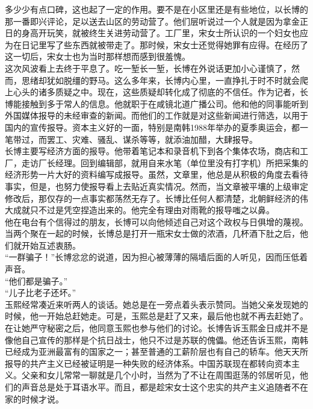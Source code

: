 多少少有点口碑，这也起了一定的作用。要不是在小区里还是有些地位，以长博的那一番即兴评论，足以送去山区的劳动营了。他们层听说过一个人就是因为拿金正日的身高开玩笑，就被终生关进劳动营了。工厂里，宋女士所认识的一个妇女也应为在日记里写了些东西就被带走了。那时候，宋女士还觉得她罪有应得。在经历了这一切后，宋女士也为当时那样想而感到很羞愧。\\

这次风波看上去终于平息了。吃一堑长一堑，长博在外说话更加小心谨慎了，然而，思绪却犹如脱缰的野马。这么多年来，长博内心里，一直挣扎于时不时就会爬上心头的诸多质疑之中。现在，这些质疑却转化成了彻底的不信任。作为记者，长博能接触到多于常人的信息。他就职于在咸镜北道广播公司。他和他的同事能听到外国媒体报导的未经审查的新闻。而他们的工作就是对这些新闻进行筛选，以用于国内的宣传报导。资本主义好的一面，特别是南韩1988年举办的夏季奥运会，都一笔带过，而罢工、灾难、骚乱、谋杀等等，就添油加醋，大肆报导。\\

长博主要写经济方面的报导。他带着笔记本和录音机下到各个集体农场，商店和工厂，走访厂长经理。回到编辑部，就用自来水笔（单位里没有打字机）所把采集的经济形势一片大好的资料编写成报导。虽然，文章里，他总是从积极的角度去看待事实，但是，也努力使报导看上去贴近真实情况。然而，当文章被平壤的上级审定修改后，那仅存的一点事实都荡然无存了。长博比任何人都清楚，北朝鲜经济的伟大成就只不过是凭空捏造出来的。他完全有理由对雨靴的报导嗤之以鼻。\\

他在电台有个信得过的朋友，长博可以向他倾述自己对这个政权与日俱增的蔑视。当两个聚在一起的时候，长博总是打开一瓶宋女士做的浓酒，几杯酒下肚之后，他们就开始互述衷肠。\\

“一群骗子！”长博忿忿的说道，因为担心被薄薄的隔墙后面的人听见，因而压低着声音。\\

“他们都是骗子。”\\

“儿子比老子还坏。”\\

玉熙经常凑近来听两人的谈话。她总是在一旁点着头表示赞同。当她父亲发现她的时候，他一开始总赶她走。可是，玉熙总是赶了又来，最后他也就不再去赶她了。在让她严守秘密之后，他同意玉熙也参与他们的讨论。长博告诉玉熙金日成并不是像他自己宣传的那样是个抗日战士，他只不过是苏联的傀儡。他还告诉玉熙，南韩已经成为亚洲最富有的国家之一；甚至普通的工薪阶层也有自己的轿车。他天天所报导的共产主义已经被证明是一种失败的经济体系。中国苏联现在都转向资本主义。父亲和女儿常常一聊就是几个小时，当然为了不让在周围逛荡的邻居听见，他们的声音总是处于耳语水平。而且，都是趁宋女士这个忠实的共产主义追随者不在家的时候才说。\\
